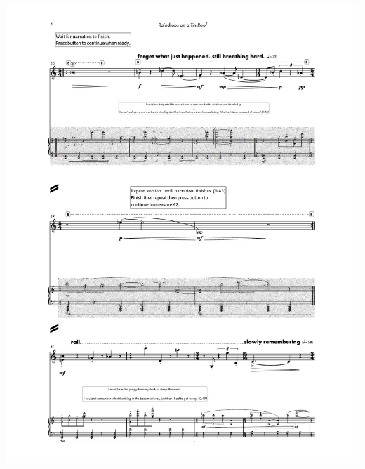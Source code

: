 \begin{center}
     \includegraphics[scale=0.75]{Scores/raindrops_Part10.pdf}
\end{center}
\newpage

